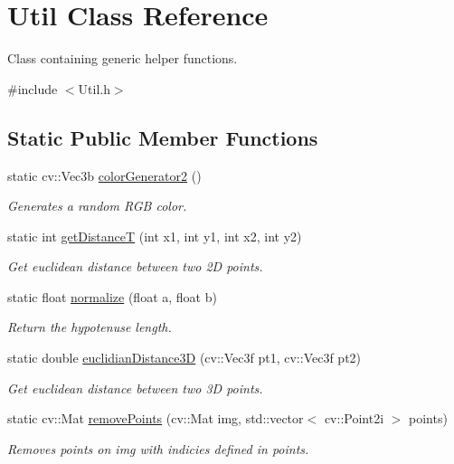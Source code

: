 \hypertarget{class_util}{}\section{Util Class Reference}
\label{class_util}


Class containing generic helper functions.  




{\ttfamily \#include $<$Util.\+h$>$}

\subsection*{Static Public Member Functions}
\begin{DoxyCompactItemize}
\item 
static cv\+::\+Vec3b \hyperlink{class_util_a4b35aebe2f6ea734a9221356c0ad38ec}{color\+Generator2} ()
\begin{DoxyCompactList}\small\item\em Generates a random R\+GB color. \end{DoxyCompactList}\item 
static int \hyperlink{class_util_a1213364e3ea975aa7f3713f3ad5a96a7}{get\+DistanceT} (int x1, int y1, int x2, int y2)
\begin{DoxyCompactList}\small\item\em Get euclidean distance between two 2D points. \end{DoxyCompactList}\item 
static float \hyperlink{class_util_a003878685d2eba96fadc4fdae502688e}{normalize} (float a, float b)
\begin{DoxyCompactList}\small\item\em Return the hypotenuse length. \end{DoxyCompactList}\item 
static double \hyperlink{class_util_afcaa0a0b92e0fd117be8dead6a7787f3}{euclidian\+Distance3D} (cv\+::\+Vec3f pt1, cv\+::\+Vec3f pt2)
\begin{DoxyCompactList}\small\item\em Get euclidean distance between two 3D points. \end{DoxyCompactList}\item 
static cv\+::\+Mat \hyperlink{class_util_abf2cc717b8e145166f247df2742a0325}{remove\+Points} (cv\+::\+Mat img, std\+::vector$<$ cv\+::\+Point2i $>$ points)
\begin{DoxyCompactList}\small\item\em Removes points on img with indicies defined in points. \end{DoxyCompactList}\item 

\end{DoxyCompactItemize}
